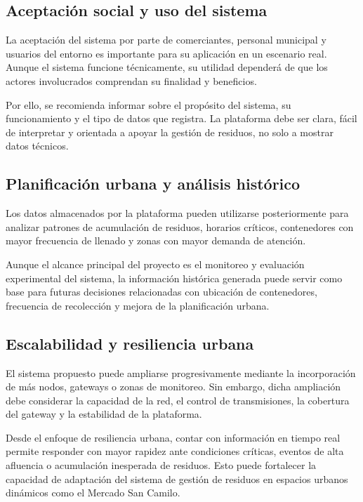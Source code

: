 \subsection{Aceptación social y uso del sistema}

La aceptación del sistema por parte de comerciantes, personal municipal y usuarios del entorno es importante para su aplicación en un escenario real. Aunque el sistema funcione técnicamente, su utilidad dependerá de que los actores involucrados comprendan su finalidad y beneficios.

Por ello, se recomienda informar sobre el propósito del sistema, su funcionamiento y el tipo de datos que registra. La plataforma debe ser clara, fácil de interpretar y orientada a apoyar la gestión de residuos, no solo a mostrar datos técnicos.

\subsection{Planificación urbana y análisis histórico}

Los datos almacenados por la plataforma pueden utilizarse posteriormente para analizar patrones de acumulación de residuos, horarios críticos, contenedores con mayor frecuencia de llenado y zonas con mayor demanda de atención.

Aunque el alcance principal del proyecto es el monitoreo y evaluación experimental del sistema, la información histórica generada puede servir como base para futuras decisiones relacionadas con ubicación de contenedores, frecuencia de recolección y mejora de la planificación urbana.

\subsection{Escalabilidad y resiliencia urbana}

El sistema propuesto puede ampliarse progresivamente mediante la incorporación de más nodos, gateways o zonas de monitoreo. Sin embargo, dicha ampliación debe considerar la capacidad de la red, el control de transmisiones, la cobertura del gateway y la estabilidad de la plataforma.

Desde el enfoque de resiliencia urbana, contar con información en tiempo real permite responder con mayor rapidez ante condiciones críticas, eventos de alta afluencia o acumulación inesperada de residuos. Esto puede fortalecer la capacidad de adaptación del sistema de gestión de residuos en espacios urbanos dinámicos como el Mercado San Camilo.
